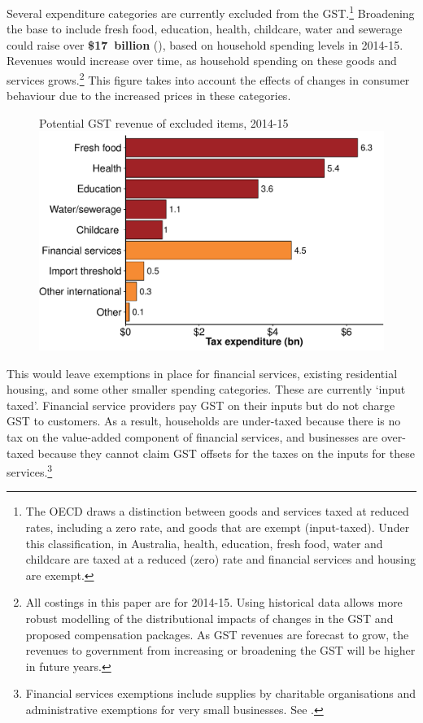 Several expenditure categories are currently excluded from the GST.\footnote{The OECD draws a distinction between goods and services taxed at reduced rates, including a zero rate, and goods that are exempt (input-taxed). Under this classification, in Australia, health, education, fresh food, water and childcare are taxed at a reduced (zero) rate and financial services and housing are exempt.}  Broadening the base to include fresh food, education, health, childcare, water and sewerage could raise over \textbf{\$17~billion} (), based on household spending levels in 2014-15. Revenues would increase over time, as household spending on these goods and services grows.\footnote{All costings in this paper are for 2014-15. Using historical data allows more robust modelling of the distributional impacts of changes in the GST and proposed compensation packages. As GST revenues are forecast to grow, the revenues to government from increasing or broadening the GST will be higher in future years.} This figure takes into account the effects of changes in consumer behaviour due to the increased prices in these categories. 

\begin{figure}
%
{Potential GST revenue of excluded items, 2014-15}
\includegraphics[width=\columnwidth]{atlas/GST_revenue_of_excluded_items1415-1.pdf}

\end{figure}

This would leave exemptions in place for financial services, existing residential housing, and some other smaller spending categories.  These are currently ‘input taxed’. Financial service providers pay GST on their inputs but do not charge GST to customers.  As a result, households are under-taxed because there is no tax on the value-added component of financial services, and businesses are over-taxed because they cannot claim GST offsets for the taxes on the inputs for these services.\footnote{Financial services exemptions include supplies by charitable organisations and administrative exemptions for very small businesses. See \textcite[][169]{Treasury2014TES2013}.}

